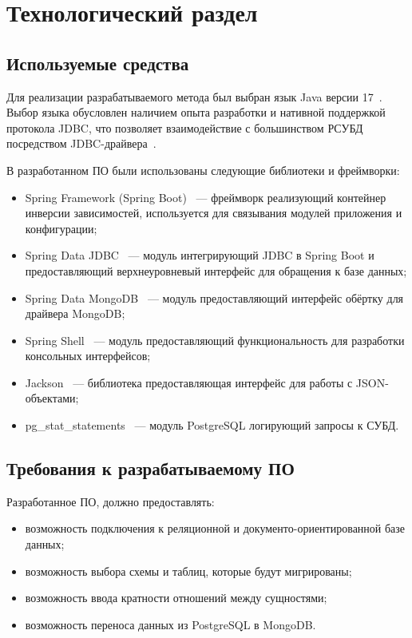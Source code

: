 \chapter{Технологический раздел}

\section{Используемые средства} 
Для реализации разрабатываемого метода был выбран язык Java версии 17~\cite{openjdk-17}.
Выбор языка обусловлен наличием опыта разработки и нативной поддержкой протокола JDBC,
что позволяет взаимодействие с большинством РСУБД посредством JDBC-драйвера~\cite{jdbc-api}.

В разработанном ПО были использованы следующие библиотеки и фреймворки:
\begin{itemize}[label=---]
    \item Spring Framework (Spring Boot)~\cite{spring-boot} --- фреймворк реализующий контейнер инверсии зависимостей, 
    используется для связывания модулей приложения и конфигурации;
    \item Spring Data JDBC~\cite{spring-data-jdbc} --- модуль интегрирующий JDBC в Spring Boot и
    предоставляющий верхнеуровневый интерфейс для обращения к базе данных;
    \item Spring Data MongoDB~\cite{spring-data-mongodb} --- модуль предоставляющий интерфейс обёртку для драйвера MongoDB;
    \item Spring Shell~\cite{spring-shell} --- модуль предоставляющий функциональность для разработки консольных интерфейсов;
    \item Jackson~\cite{jackson-databind} --- библиотека предоставляющая интерфейс для работы с JSON-объектами;
    \item pg\_stat\_statements~\cite{pg-stat-statements} --- модуль PostgreSQL логирующий запросы к СУБД.
\end{itemize}
 
 
\section{Требования к разрабатываемому ПО}
Разработанное ПО, должно предоставлять:
\begin{itemize}[label=---]
    \item возможность подключения к реляционной и документо-ориентированной базе данных;
    \item возможность выбора схемы и таблиц, которые будут мигрированы;
    \item возможность ввода кратности отношений между сущностями;
    \item возможность переноса данных из PostgreSQL в MongoDB.
\end{itemize}
 

